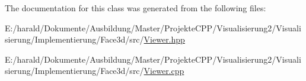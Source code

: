 The documentation for this class was generated from the following files\+:\begin{DoxyCompactItemize}
\item 
E\+:/harald/\+Dokumente/\+Ausbildung/\+Master/\+Projekte\+C\+P\+P/\+Visualisierung2/\+Visualisierung/\+Implementierung/\+Face3d/src/\hyperlink{_viewer_8hpp}{Viewer.\+hpp}\item 
E\+:/harald/\+Dokumente/\+Ausbildung/\+Master/\+Projekte\+C\+P\+P/\+Visualisierung2/\+Visualisierung/\+Implementierung/\+Face3d/src/\hyperlink{_viewer_8cpp}{Viewer.\+cpp}\end{DoxyCompactItemize}
